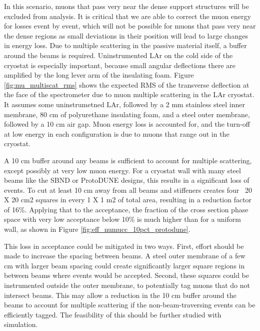 In this scenario, muons that pass very near the dense support structures will be excluded from analysis. It is critical that we are able to correct the muon energy for losses event by event, which will not be possible for muons that pass very near the dense regions as small deviations in their position will lead to large changes in energy loss. Due to multiple scattering in the passive material itself, a buffer around the beams is required. Uninstrumented LAr on the cold side of the cryostat is especially important, because small angular deflections there are amplified by the long lever arm of the insulating foam. Figure \ref{fig:mu_multiscat_rms} shows the expected RMS of the transverse deflection at the face of the spectrometer due to muon multiple scattering in the LAr cryostat. It assumes some uninstrumetned LAr, followed by a 2 mm stainless steel inner membrane, 80 cm of polyurethane insulating foam, and a steel outer membrane, followed by a 10 cm air gap. Muon energy loss is accounted for, and the turn-off at low energy in each configuration is due to muons that range out in the cryostat.

A 10 cm buffer around any beams is sufficient to account for multiple scattering, except possibly at very low muon energy. For a cryostat wall with many steel beams like the SBND or ProtoDUNE designs, this results in a significant loss of events. To cut at least 10 cm away from all beams and stiffeners creates four ~20 X 20 cm2 squares in every 1 X 1 m2 of total area, resulting in a reduction factor of 16\%. Applying that to the acceptance, the fraction of the cross section phase space with very low acceptance below 10\% is much higher than for a uniform wall, as shown in Figure \ref{fig:eff_numucc_10pct_protodune}.

This loss in acceptance could be mitigated in two ways. First, effort should be made to increase the spacing between beams. A steel outer membrane of a few cm with larger beam spacing could create significantly larger square regions in between beams where events would be accepted. Second, these squares could be instrumented outside the outer membrane, to potentially tag muons that do not intersect beams. This may allow a reduction in the 10 cm buffer around the beams to account for multiple scattering if the non-beam-traversing events can be efficiently tagged. The feasibility of this should be further studied with simulation.

